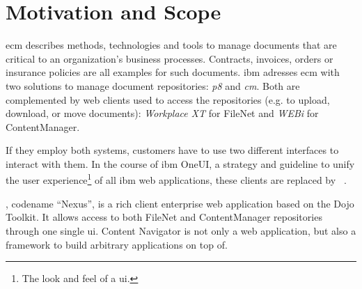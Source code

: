 







\section{Motivation and Scope}
\ac{ecm} describes methods, technologies and tools to manage documents that are critical to an organization's business processes. Contracts, invoices, orders or insurance policies are all examples for such documents. \ac{ibm} adresses \ac{ecm} with two solutions to manage document repositories: \emph{\gls{p8}} and \emph{\gls{cm}}. Both are complemented by web clients used to access the repositories (e.g. to upload, download, or move documents): \emph{Workplace XT} for FileNet and \emph{WEBi} for ContentManager.

If they employ both systems, customers have to use two different interfaces to interact with them. In the course of \ac{ibm} OneUI, a strategy and guideline to unify the user experience\footnote{The look and feel of a \ac{ui}.} of all \ac{ibm} web applications, these clients are replaced by \emph{\ibm~\nexus}.

\nexus, codename ``Nexus'', is a rich client enterprise web application based on the Dojo Toolkit. It allows access to both FileNet and ContentManager repositories through one single \ac{ui}. Content Navigator is not only a web application, but also a framework to build arbitrary applications on top of.

